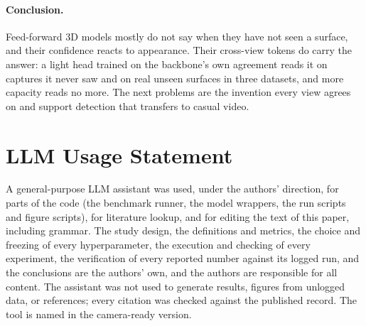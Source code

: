 \documentclass[10pt,twocolumn,letterpaper]{article}
\begin{document}
\paragraph{Conclusion.} Feed-forward 3D models mostly do not say when they have not seen a surface, and their confidence reacts to appearance. Their cross-view tokens do carry the answer: a light head trained on the backbone's own agreement reads it on captures it never saw and on real unseen surfaces in three datasets, and more capacity reads no more. The next problems are the invention every view agrees on and support detection that transfers to casual video.

\section*{LLM Usage Statement}
A general-purpose LLM assistant was used, under the authors' direction, for parts of the code (the benchmark runner, the model wrappers, the run scripts and figure scripts), for literature lookup, and for editing the text of this paper, including grammar. The study design, the definitions and metrics, the choice and freezing of every hyperparameter, the execution and checking of every experiment, the verification of every reported number against its logged run, and the conclusions are the authors' own, and the authors are responsible for all content. The assistant was not used to generate results, figures from unlogged data, or references; every citation was checked against the published record. The tool is named in the camera-ready version.

{\small


}
\end{document}
